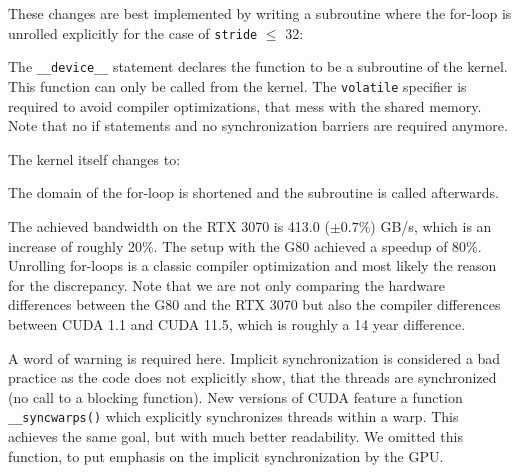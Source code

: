 These changes are best implemented by writing a subroutine where the for-loop is unrolled explicitly for the case of \texttt{stride} \(\le\) 32:

The \texttt{\_\_device\_\_} statement declares the function to be a subroutine of the kernel.
This function can only be called from the kernel.
The \texttt{volatile} specifier is required to avoid compiler optimizations, that mess with the shared memory.
Note that no if statements and no synchronization barriers are required anymore.

The kernel itself changes to:

The domain of the for-loop is shortened and the subroutine is called afterwards.

The achieved bandwidth on the RTX 3070 is 413.0 (\( \pm 0.7\% \)) GB/s, which is an increase of roughly 20\%.
The setup with the G80 achieved a speedup of 80\%.
Unrolling for-loops is a classic compiler optimization and most likely the reason for the discrepancy.
Note that we are not only comparing the hardware differences between the G80 and the RTX 3070 but also the compiler differences between CUDA 1.1 and CUDA 11.5, which is roughly a 14 year difference.

A word of warning is required here.
Implicit synchronization is considered a bad practice as the code does not explicitly show, that the threads are synchronized (no call to a blocking function).
New versions of CUDA feature a function \texttt{\_\_syncwarps()} which explicitly synchronizes threads within a warp.
This achieves the same goal, but with much better readability.
We omitted this function, to put emphasis on the implicit synchronization by the GPU.

